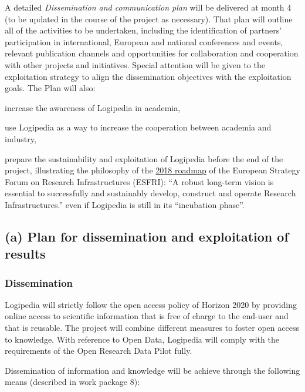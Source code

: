 A detailed {\em Dissemination and communication plan} will be
delivered at month 4 (to be updated in the course of the project as
necessary). That plan will outline all of the activities to be
undertaken, including the identification of partners' participation in
international, European and national conferences and events, relevant
publication channels and opportunities for collaboration and
cooperation with other projects and initiatives. Special attention
will be given to the exploitation strategy to align the dissemination
objectives with the exploitation goals. The Plan will also:
\begin{compactitem}
\item increase the awareness of Logipedia in academia, 
\item use Logipedia as a way to increase the cooperation between academia and
industry,
\item prepare the sustainability and exploitation of Logipedia before the
  end of the project, illustrating the philosophy of 
the 
\href{http://roadmap2018.esfri.eu/media/1048/rm2018-part1-20.pdf}{2018
  roadmap} of the European Strategy Forum on Research Infrastructures
(ESFRI): 
``A robust long-term vision is essential to successfully and
sustainably develop, construct and operate Research Infrastructures.''
even if Logipedia is still in its ``incubation phase''.
\end{compactitem}

\subsection*{(a) Plan for dissemination and exploitation of results}
\label{sec:dissemination}


\subsubsection*{Dissemination}

Logipedia will strictly follow the open access policy of Horizon 2020
by providing online access to scientific information that is free of
charge to the end-user and that is reusable.  The project will combine
different measures to foster open access to knowledge. With reference
to Open Data, Logipedia will comply with the requirements of the Open
Research Data Pilot fully.

Dissemination of information and knowledge will be achieve through
the following means (described in work package 8):

